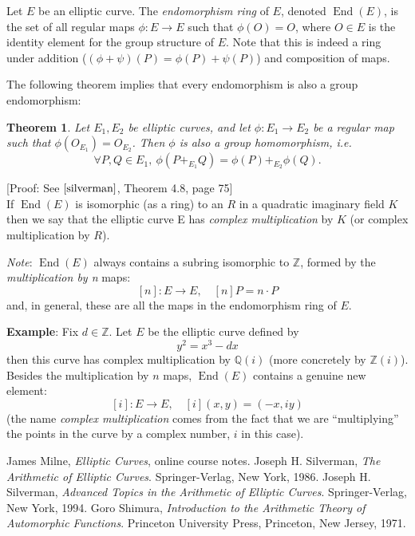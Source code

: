 \documentclass[12pt]{article}
\newtheorem{thm}{Theorem}
\begin{document}
Let $E$ be an elliptic curve. The {\it endomorphism ring} of $E$,
denoted $\operatorname{End}(E)$, is the set of all regular maps $\phi \colon E
\to E$ such that $\phi(O)=O$, where $O \in E$ is the
identity element for the group structure of $E$. Note that this is
indeed a ring under addition ($(\phi + \psi)(P)=\phi(P) +
\psi(P)$) and composition of maps.

The following theorem implies that every endomorphism is also a
group endomorphism:
\begin{thm}
Let $E_1, E_2$ be elliptic curves, and let $\phi \colon E_1
\to E_2$ be a regular map such that
$\phi(O_{E_1})=O_{E_2}$. Then $\phi$ is also a group homomorphism,
i.e. $$\forall P,Q \in E_1,\ \phi(P +_{E_1}
Q)=\phi(P)+_{E_2}\phi(Q).$$
\end{thm}
[Proof: See $\cite{silverman}$, Theorem 4.8, page 75]
\\

If $\operatorname{End}(E)$ is isomorphic (as a ring) to an  $R$ in a quadratic imaginary
field $K$ then we say that the elliptic curve E has {\it complex
multiplication} by $K$ (or complex multiplication by $R$).

{\it Note}: $\operatorname{End}(E)$ always contains a subring isomorphic to
$\mathbb{Z}$, formed by the {\it multiplication by n} maps:
$$[n]\colon E \to E,\quad [n]P=n\cdot P$$
and, in general, these are all the maps in the endomorphism ring of $E$.

{\bf Example}: Fix $d\in \mathbb{Z}$. Let $E$ be the elliptic
curve defined by
$$y^2=x^3-dx$$
then this curve has complex multiplication by $\mathbb{Q}(i)$
(more concretely by $\mathbb{Z}(i)$). Besides the multiplication
by $n$ maps, $\operatorname{End}(E)$ contains a genuine new element:
$$[i]\colon E \to E,\quad [i](x,y)=(-x,iy)$$
(the name {\it complex multiplication} comes from the fact that we
are ``multiplying'' the points in the curve by a complex number, $i$
in this case).

\begin{thebibliography}{8}
 James Milne, {\em Elliptic Curves}, online course notes. 
 Joseph H. Silverman, {\em The Arithmetic of Elliptic Curves}. Springer-Verlag, New York, 1986.
 Joseph H. Silverman, {\em Advanced Topics in
the Arithmetic of Elliptic Curves}. Springer-Verlag, New York,
1994.
 Goro Shimura, {\em Introduction to the
Arithmetic Theory of Automorphic Functions}. Princeton University
Press, Princeton, New Jersey, 1971.
\end{thebibliography}
\end{document}
